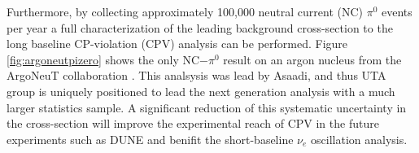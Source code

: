 Furthermore, by collecting approximately 100,000 neutral current (NC) $\pi^{0}$ events per year a full characterization of the leading background cross-section to the long baseline CP-violation (CPV) analysis can be performed. Figure \ref{fig:argoneutpizero} shows the only NC$-\pi^0$ result on an argon nucleus from the ArgoNeuT collaboration \cite{Argoneut}. This analsysis was lead by Asaadi, and thus UTA group is uniquely positioned to lead the next generation analysis with a much larger statistics sample. A significant reduction of this systematic uncertainty in the cross-section will improve the experimental reach of CPV in the future experiments such as DUNE and benifit the short-baseline $\nu_{e}$ oscillation analysis.
